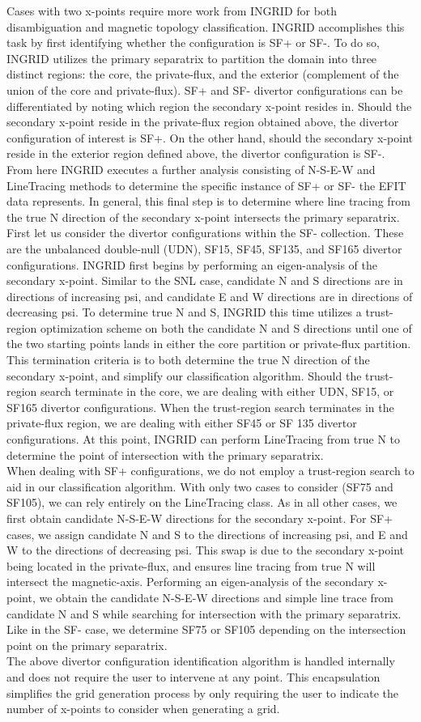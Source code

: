Cases with two x-points require more work from INGRID for both disambiguation and magnetic topology classification. INGRID accomplishes this task by first identifying whether the configuration is SF+ or SF-. To do so, INGRID utilizes the primary separatrix to partition the domain into three distinct regions: the core, the private-flux, and the exterior (complement of the union of the core and private-flux). SF+ and SF- divertor configurations can be differentiated by noting which region the secondary x-point resides in. Should the secondary x-point reside in the private-flux region obtained above, the divertor configuration of interest is SF+. On the other hand, should the secondary x-point reside in the exterior region defined above, the divertor configuration is SF-. From here INGRID executes a further analysis consisting of N-S-E-W and LineTracing methods to determine the specific instance of SF+ or SF- the EFIT data represents. In general, this final step is to determine where line tracing from the true N direction of the secondary x-point intersects the primary separatrix.\\ \indent
First let us consider the divertor configurations within the SF- collection. These are the unbalanced double-null (UDN), SF15, SF45, SF135, and SF165 divertor configurations. INGRID first begins by performing an eigen-analysis of the secondary x-point. Similar to the SNL case, candidate N and S directions are in directions of increasing psi, and candidate E and W directions are in directions of decreasing psi. To determine true N and S, INGRID this time utilizes a trust-region optimization scheme on both the candidate N and S directions until one of the two starting points lands in either the core partition or private-flux partition. This termination criteria is to both determine the true N direction of the secondary x-point, and simplify our classification algorithm. Should the trust-region search terminate in the core, we are dealing with either UDN, SF15, or SF165 divertor configurations. When the trust-region search terminates in the private-flux region, we are dealing with either SF45 or SF 135 divertor configurations. At this point, INGRID can perform LineTracing from true N to determine the point of intersection with the primary separatrix.\\ \indent
When dealing with SF+ configurations, we do not employ a trust-region search to aid in our classification algorithm. With only two cases to consider (SF75 and SF105), we can rely entirely on the LineTracing class. As in all other cases, we first obtain candidate N-S-E-W directions for the secondary x-point. For SF+ cases, we assign candidate N and S to the directions of increasing psi, and E and W to the directions of decreasing psi. This swap is due to the secondary x-point being located in the private-flux, and ensures line tracing from true N will intersect the magnetic-axis. Performing an eigen-analysis of the secondary x-point, we obtain the candidate N-S-E-W directions and simple line trace from candidate N and S while searching for intersection with the primary separatrix. Like in the SF- case, we determine SF75 or SF105 depending on the intersection point on the primary separatrix.\\ \indent
The above divertor configuration identification algorithm is handled internally and does not require the user to intervene at any point. This encapsulation simplifies the grid generation process by only requiring the user to indicate the number of x-points to consider when generating a grid.
